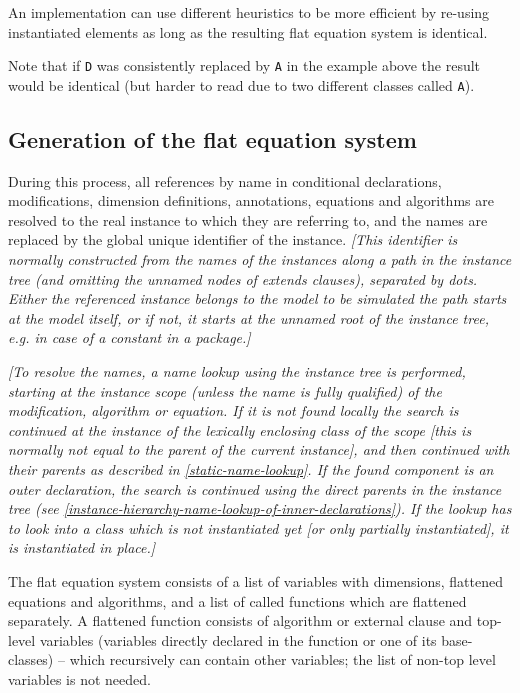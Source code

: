 \begin{example}
An implementation can use different heuristics to be more
efficient by re-using instantiated elements as long as the resulting
flat equation system is identical.

Note that if \lstinline!D! was consistently replaced by \lstinline!A! in the example
above the result would be identical (but harder to read due to two
different classes called \lstinline!A!).
\end{example}

\subsection{Generation of the flat equation system}

During this process, all references by name in conditional declarations,
modifications, dimension definitions, annotations, equations and
algorithms are resolved to the real instance to which they are referring
to, and the names are replaced by the global unique identifier of the
instance. \emph{{[}This identifier is normally constructed from the
names of the instances along a path in the instance tree (and omitting
the unnamed nodes of extends clauses), separated by dots. Either the
referenced instance belongs to the model to be simulated the path starts
at the model itself, or if not, it starts at the unnamed root of the
instance tree, e.g. in case of a constant in a package.{]}}

\emph{{[}To resolve the names, a name lookup using the instance tree is
performed, starting at the instance scope (unless the name is fully
qualified) of the modification, algorithm or equation. If it is not
found locally the search is continued at the instance of the lexically
enclosing class of the scope {[}this is normally not equal to the parent
of the current instance{]}, and then continued with their parents as
described in \autoref{static-name-lookup}. If the found component is an outer
declaration, the search is continued using the direct parents in the
instance tree (see \autoref{instance-hierarchy-name-lookup-of-inner-declarations}). If the lookup has to look into a
class which is not instantiated yet [or only partially
  instantiated], it is instantiated in place.]}

  The flat equation system consists of a list of variables with
  dimensions, flattened equations and algorithms, and a list of called
functions which are flattened separately. A flattened function consists
of algorithm or external clause and top-level variables (variables
directly declared in the function or one of its base-classes) -- which
recursively can contain other variables; the list of non-top level
variables is not needed.

